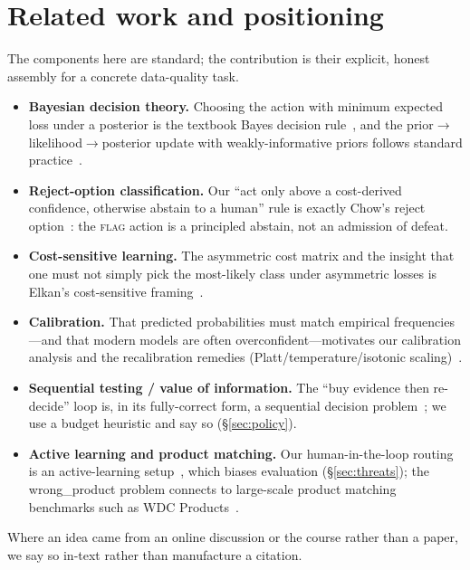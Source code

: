 \documentclass[11pt]{article}
\begin{document}
\section{Related work and positioning}
\label{sec:related}

The components here are standard; the contribution is their explicit, honest
assembly for a concrete data-quality task.

\begin{itemize}[nosep]
  \item \textbf{Bayesian decision theory.} Choosing the action with minimum expected
        loss under a posterior is the textbook Bayes decision rule~\cite{berger1985},
        and the prior$\rightarrow$likelihood$\rightarrow$posterior update with
        weakly-informative priors follows standard practice~\cite{gelman2013bda}.
  \item \textbf{Reject-option classification.} Our ``act only above a cost-derived
        confidence, otherwise abstain to a human'' rule is exactly Chow's reject
        option~\cite{chow1970}: the \textsc{flag} action is a principled abstain, not
        an admission of defeat.
  \item \textbf{Cost-sensitive learning.} The asymmetric cost matrix and the insight
        that one must not simply pick the most-likely class under asymmetric losses
        is Elkan's cost-sensitive framing~\cite{elkan2001}.
  \item \textbf{Calibration.} That predicted probabilities must match empirical
        frequencies---and that modern models are often overconfident---motivates our
        calibration analysis and the recalibration remedies (Platt/temperature/isotonic
        scaling)~\cite{guo2017calibration,platt1999,zadrozny2002}.
  \item \textbf{Sequential testing / value of information.} The ``buy evidence then
        re-decide'' loop is, in its fully-correct form, a sequential decision
        problem~\cite{wald1945sprt}; we use a budget heuristic and say so
        (\S\ref{sec:policy}).
  \item \textbf{Active learning and product matching.} Our human-in-the-loop routing
        is an active-learning setup~\cite{settles2009active}, which biases evaluation
        (\S\ref{sec:threats}); the \textsf{wrong\_product} problem connects to
        large-scale product matching benchmarks such as WDC
        Products~\cite{primpeli2019wdc}.
\end{itemize}

\noindent
Where an idea came from an online discussion or the course rather than a paper, we say
so in-text rather than manufacture a citation.
\end{document}
